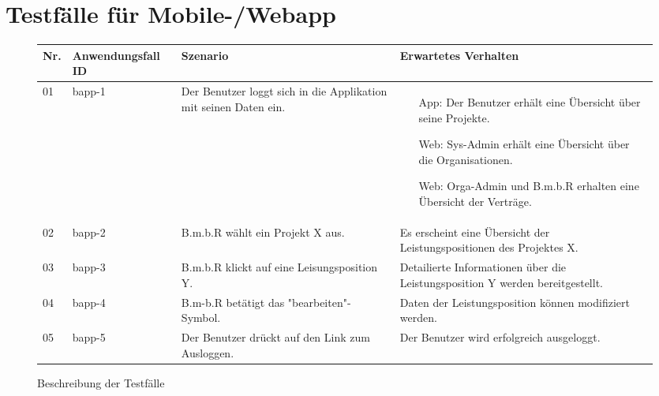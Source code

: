 
\section{Testfälle für Mobile-/Webapp}
\begin{figure}[!h]
	\begin{center}
		\begin{tabularx}{\textwidth}{ p{} | p{} | p{} | X }
			\textbf{Nr.} & \textbf{Anwendungsfall ID} & \textbf{Szenario} & \textbf{Erwartetes Verhalten} \\ \hline
			01 & bapp-1 & Der Benutzer loggt sich in die Applikation mit seinen Daten ein. & 
			\begin{itemize}
				\item[App:] Der Benutzer erhält eine Übersicht über seine Projekte.
				\item[Web:] Sys-Admin erhält eine Übersicht über die Organisationen.
				\item[Web:] Orga-Admin und B.m.b.R erhalten eine Übersicht der Verträge.
			\end{itemize} \\ \hline
			02 & bapp-2 & B.m.b.R wählt ein Projekt X aus. & Es erscheint eine Übersicht der Leistungspositionen des Projektes X. \\ \hline
			03 & bapp-3 & B.m.b.R klickt auf eine Leisungsposition Y. & Detailierte Informationen über die Leistungsposition Y werden bereitgestellt. \\ \hline
			04 & bapp-4 & B.m-b.R betätigt das "bearbeiten"-Symbol. & Daten der Leistungsposition können modifiziert werden. \\ \hline
			05 & bapp-5 & Der Benutzer drückt auf den Link zum Ausloggen. & Der Benutzer wird erfolgreich ausgeloggt. \\ \hline
		\end{tabularx}	
	\end{center}
	\caption{Beschreibung der Testfälle}
	\label{fig:testfaelle-beide-anwendungen-tabelle}
\end{figure}

